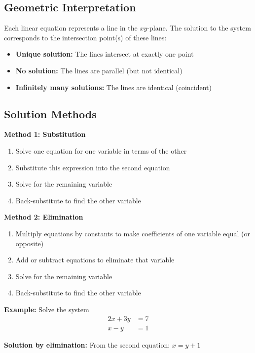 \documentclass[12pt]{article}
\begin{document}
\subsection{Geometric Interpretation}

Each linear equation represents a line in the $xy$-plane. The solution to the system corresponds to the intersection point(s) of these lines:

\begin{itemize}
\item \textbf{Unique solution:} The lines intersect at exactly one point
\item \textbf{No solution:} The lines are parallel (but not identical)  
\item \textbf{Infinitely many solutions:} The lines are identical (coincident)
\end{itemize}

\subsection{Solution Methods}

\textbf{Method 1: Substitution}
\begin{enumerate}
\item Solve one equation for one variable in terms of the other
\item Substitute this expression into the second equation
\item Solve for the remaining variable
\item Back-substitute to find the other variable
\end{enumerate}

\textbf{Method 2: Elimination}
\begin{enumerate}
\item Multiply equations by constants to make coefficients of one variable equal (or opposite)
\item Add or subtract equations to eliminate that variable
\item Solve for the remaining variable
\item Back-substitute to find the other variable
\end{enumerate}

\textbf{Example:} Solve the system
\begin{align}
2x + 3y &= 7 \\
x - y &= 1
\end{align}

\textbf{Solution by elimination:}
From the second equation: $x = y + 1$
\end{document}
